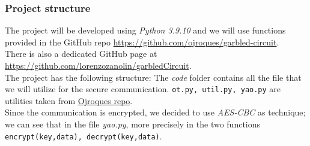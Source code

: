 \documentclass[12pt]{article}
\newcommand{\inlinecode}{\texttt}
\begin{document}
\subsubsection{Project structure}
The project will be developed using \textit{Python 3.9.10} and we will use functions provided in the GitHub repo \url{https://github.com/ojroques/garbled-circuit}\label{ref:git}.\\
There is also a dedicated GitHub page at \url{https://github.com/lorenzozanolin/garbledCircuit}.\\
The project has the following structure:
The \textit{code} folder contains all the file that we will utilize for the secure communication. \inlinecode{ot.py, util.py, yao.py} are utilities taken from \hyperref[ref:git]{Ojroques repo}.\\ Since the communication is encrypted, we decided to use \textit{AES-CBC} as technique; we can see that in the file \textit{yao.py}, more precisely in the two functions \inlinecode{encrypt(key,data), decrypt(key,data)}.


 
\end{document}
